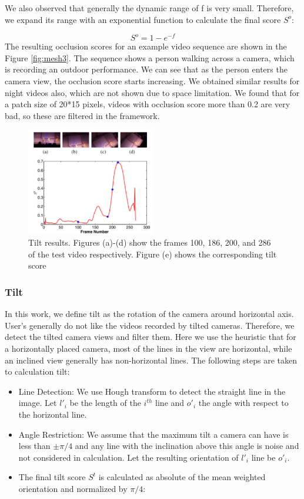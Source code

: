 \documentclass{sig-alternate}
\begin{document}
We also observed that generally the dynamic range of f is very
small. Therefore, we expand its range with an exponential function
to calculate the final score $S^o$:

\begin{equation}
    S^o = {1 {-} {e}^{{-}f}}
\end{equation}
The resulting occlusion scores for an example video sequence
are shown in the Figure \ref{fig:mesh3}. The sequence shows a person walking
across a camera, which is recording an outdoor performance. We
can see that as the person enters the camera view, the occlusion
score starts increasing. We obtained similar results for night videos
also, which are not shown due to space limitation. We found that
for a patch size of 20*15 pixels, videos with occlusion score more
than 0.2 are very bad, so these are filtered in the framework.
\begin{figure}[h]
	\centering
	\includegraphics[width=0.5\textwidth]{img4.png}
	\caption{Tilt results. Figures (a)-(d) show the frames 100, 186,
		200, and 286 of the test video respectively. Figure (e) shows the
		corresponding tilt score}
	\label{fig:mesh4}
\end{figure}
\subsubsection{Tilt}
In this work, we define tilt as the rotation of the camera around
horizontal axis. User's generally do not like the videos recorded
by tilted cameras. Therefore, we detect the tilted camera views
and filter them. Here we use the heuristic that for a horizontally
placed camera, most of the lines in the view are horizontal, while
an inclined view generally has non-horizontal lines. The following
steps are taken to calculation tilt:

\begin{itemize}
\item Line Detection: We use Hough transform to detect the straight
line in the image. Let $l'_i$ be the length of the $i^{th}$ line and $o'_i$ the angle with respect to the horizontal line.
\item Angle Restriction: We assume that the maximum tilt a camera can have is less than $\pm \pi/4 $ and any line with the inclination above this angle is noise and not considered in calculation. Let the resulting orientation of $l'_i$ line be $o'_i$.
\item The final tilt score $S^t$ is calculated as absolute of the mean
weighted orientation and normalized by $\pi/4$:
\end{itemize}
\end{document}
